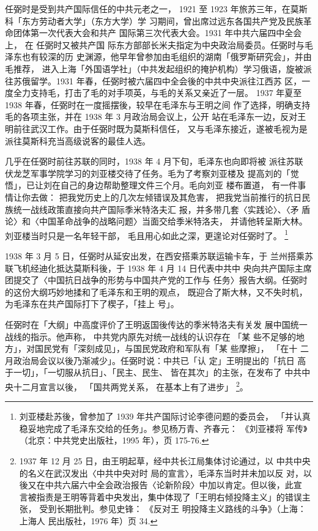 任弼时是受到共产国际信任的中共元老之一，
1921 至 1923 年旅苏三年，在莫斯科「东方劳动者大学」（东方大学）学
习期间，曾出席过远东各国共产党及民族革命团体第一次代表大会和共产
国际第三次代表大会。1931 年中共六届四中全会上，
在
任弼时又被共产国
际东方部部长米夫指定为中央政治局委员。任弼时与毛泽东也有较深的历
史渊源，他早年曾参加由毛组织的湖南「俄罗斯研究会」，并由毛推荐，
进入上海「外国语学社」（中共发起组织的掩护机构）学习俄语，旋被派
往苏俄留学。1931 年春，任弼时被六届四中全会後的中共中央派往江西苏
区，一度全力支持毛，打击了毛的对手项英，与毛的关系又亲近了一层。
1937 年夏至 1938 年春，任弼时在一度摇摆後，较早在毛泽东与王明之间
作了选择，明确支持毛的各项主张，并在 1938 年 3 月政治局会议上，公开
站在毛泽东一边，反对王明前往武汉工作。由于任弼时既为莫斯科信任，
又与毛泽东接近，遂被毛视为是派往莫斯科充当高级说客的最佳人选。

几乎在任弼时前往苏联的同时，1938 年 4 月下旬，毛泽东也向即将被 派往苏联
伏龙芝军事学院学习的刘亚楼交待了任务。毛为了考察刘亚楼及 提高刘的「觉
悟」，已让刘在自己的身边帮助整理文件三个月。毛向刘亚 楼布置道， 有一件事
情让你去做： 把我党历史上的几次左倾错误及其危害， 把我党当前推行的抗日民
族统一战线政策直接向共产国际季米特洛夫汇 报，并多带几套〈实践论〉、〈矛
盾论〉和〈中国革命战争的战略问题〉当面交给季米特洛夫， 并请他转呈斯大林。
刘亚楼当时只是一名年轻干部， 毛且用心如此之深，更遑论对任弼时了。
\footnote{刘亚楼赴苏後，曾参加了 1939 年共产国际讨论李德问题的委员会，
「并认真稳妥地完成了毛泽东交给的任务」。参见杨万青、齐春元： 《刘亚褛将
军传》（北京：中共党史出版社，1995 年），页 175-76.  } 

1938 年 3 月 5 日，任弼时从延安出发，在西安搭乘苏联运输卡车，于
兰州搭乘苏联飞机经迪化抵达莫斯科後，于 1938 年 4 月 14 日代表中共中
央向共产国际主席团提交了〈中国抗日战争的形势与中国共产党的工作与
任务〉报告大纲。任弼时的这份大纲巧妙地揉和了毛泽东和王明的观点，
既迎合了斯大林，又不失时机，为毛泽东在共产国际打下了楔子，「挂上
号」。

任弼时在「大纲」中高度评价了王明返国後传达的季米特洛夫有关发 展中国统一
战线的指示。他声称， 中共党内原先对统一战线的认识存在 「某 些不足够的地
方」，对国民党有「深刻成见」，与国民党政府和军队有「某 些摩擦」， 「在十
二月政治局会议以後乃渐减少」。任弼时说：中共已「认 定」王明提出的「抗日
高于一切」，「一切服从抗日」、「民主、民生、 皆在其次」的主张，在发布了
中共中央十二月宣言以後， 「国共两党关系， 在基本上有了进步」
\footnote{1937 年 12 月 25 日，由王明起草，经中共长江局集体讨论通过，以
中共中央的名义在武汉发出〈中共中央对时 局的宣言〉，毛泽东当时并未加以反
对，以後又在中共六届六中全会政治报告〈论新阶段〉中加以肯定。但以後，此宣
言被指责是王明等背着中央发出，集中体现了「王明右倾投降主义」的错误主张，
受到长期批判。参见史锋： 《反对王 明投降主义路线的斗争》（上海：上海人
民出版社，1976 年）页 34.}。

